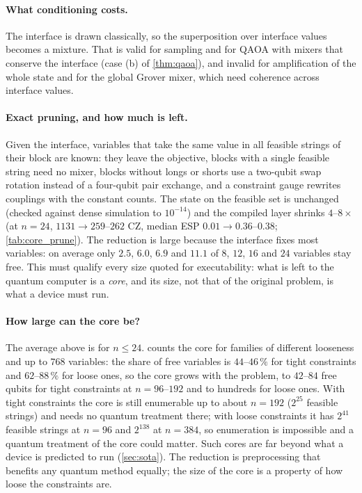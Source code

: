 \paragraph{What conditioning costs.} The interface is drawn classically, so the superposition over interface values becomes a mixture. That is valid for sampling and for QAOA with mixers that conserve the interface (case (b) of \cref{thm:qaoa}), and invalid for amplification of the whole state and for the global Grover mixer, which need coherence across interface values.

\paragraph{Exact pruning, and how much is left.} Given the interface, variables that take the same value in all feasible strings of their block are known: they leave the objective, blocks with a single feasible string need no mixer, blocks without longs or shorts use a two-qubit swap rotation instead of a four-qubit pair exchange, and a constraint gauge rewrites couplings with the constant counts. The state on the feasible set is unchanged (checked against dense simulation to $10^{-14}$) and the compiled layer shrinks $4$--$8\times$ (at $n=24$, $1131\to259$--$262$ CZ, median ESP $0.01\to0.36$--$0.38$; \cref{tab:core_prune}). The reduction is large because the interface fixes most variables: on average only $2.5$, $6.0$, $6.9$ and $11.1$ of $8$, $12$, $16$ and $24$ variables stay free. This must qualify every size quoted for executability: what is left to the quantum computer is a \emph{core}, and its size, not that of the original problem, is what a device must run.



\paragraph{How large can the core be?} The average above is for $n\le24$.  counts the core for families of different looseness and up to $768$ variables: the share of free variables is $44$--$46\,\%$ for tight constraints and $62$--$88\,\%$ for loose ones, so the core grows with the problem, to $42$--$84$ free qubits for tight constraints at $n=96$--$192$ and to hundreds for loose ones. With tight constraints the core is still enumerable up to about $n=192$ ($2^{25}$ feasible strings) and needs no quantum treatment there; with loose constraints it has $2^{41}$ feasible strings at $n=96$ and $2^{138}$ at $n=384$, so enumeration is impossible and a quantum treatment of the core could matter. Such cores are far beyond what a device is predicted to run (\cref{sec:sota}). The reduction is preprocessing that benefits any quantum method equally; the size of the core is a property of how loose the constraints are.
